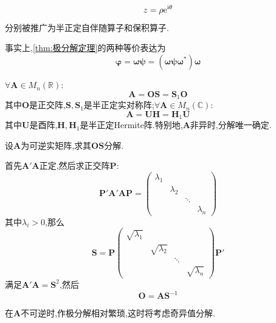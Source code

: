\[
z=\rho \mathrm{e}^{\mathrm{i}\theta}
\]分别被推广为半正定自伴随算子和保积算子.
\begin{red}
    \begin{remark}
        事实上,\cref{thm:极分解定理}的两种等价表达为\[
        \bm{\varphi}=\bm{\omega\psi}=\left(
            \bm{\omega\psi\omega}^*
        \right)\bm{\omega}
        \]
    \end{remark}
\end{red}
\begin{green}
    \begin{corollary}[极分解定理]\label{cor:极分解定理}
        $\forall\bm{A}\in M_n\left(\mathbb{R}\right):$\[
        \bm{A}=\bm{OS}=\bm{S}_1\bm{O}
        \]其中$\bm{O}$是正交阵,$\bm{S},\bm{S}_1$是半正定实对称阵;$\forall\bm{A}\in M_n\left(\mathbb{C}\right):$\[
        \bm{A}=\bm{UH}=\bm{H}_1\bm{U}
        \]其中$\bm{U}$是酉阵,$\bm{H},\bm{H}_1$是半正定\textup{Hermite}阵.特别地,$\bm{A}$非异时,分解唯一确定.
    \end{corollary}
\end{green}
\begin{brown}
    \begin{example}
        设$\bm{A}$为可逆实矩阵,求其$\bm{OS}$分解.
    \end{example}
    \begin{solution}
        首先$\bm{A}'\bm{A}$正定,然后求正交阵$\bm{P}:$\[
        \bm{P}'\bm{A}'\bm{AP}=\begin{pmatrix}
            \lambda_1&&&\\
            &\lambda_2&&\\
            &&\ddots&\\
            &&&\lambda_n
        \end{pmatrix}
        \]其中$\lambda_i>0$,那么\[
        \bm{S}=\bm{P}\begin{pmatrix}
            \sqrt{\lambda_1}&&&\\
            &\sqrt{\lambda_2}&&\\
            &&\ddots&\\
            &&&\sqrt{\lambda_n}
        \end{pmatrix}\bm{P}'
        \]满足$\bm{A}'\bm{A}=\bm{S}^2$,然后\[
        \bm{O}=\bm{AS}^{-1}
        \]
    \end{solution}
\end{brown}
\begin{red}
    \begin{remark}
        在$\bm{A}$不可逆时,作极分解相对繁琐,这时将考虑奇异值分解.
    \end{remark}
\end{red}
\newpage
